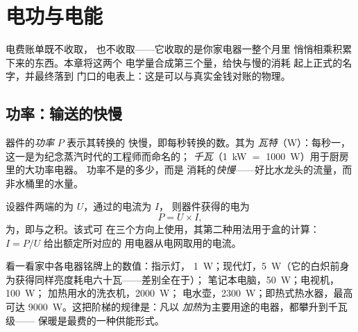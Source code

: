 \chapter{电功与电能}\label{ch:g9:electric-power-energy}

电费账单既不收取，
也不收取——它收取的是你家电器一整个月里
悄悄相乘积累下来的东西。本章将这两个
电学量合成第三个量，给快与慢的消耗
起上正式的名字，并最终落到
门口的电表上：这是可以与真实金钱对账的物理。

\section{功率：输送的快慢}

\begin{definition}[功率与瓦特]\label{def:g9:electric-power-energy:power}
器件的\emph{功率} $P$ 表示其转换的
快慢，即每秒转换的数。其为
\emph{瓦特}（\unit{W}）：每秒一，
这一是为纪念蒸汽时代的工程师而命名的；
\emph{千瓦}（\qty{1}{kW} $=$ \qty{1000}{W}）用于厨房里的大功率电器。
功率不是的多少，而是
消耗的\emph{快慢}——好比水龙头的流量，而非水桶里的水量。
%
\end{definition}

\begin{proposition}[电功率]\label{prop:g9:electric-power-energy:UI}
设器件两端的为 $U$，通过的电流为 $I$，
则器件获得的电为
\[
P = U \times I ,
\]
为，即与之积。该式可
在三个方向上使用，其第二种用法用于盒的计算：
$I = P/U$ 给出额定所对应的
用电器从电网取用的电流。
\end{proposition}

\begin{example}[家用电器的功率阶梯]\label{ex:g9:electric-power-energy:ladder}
看一看家中各电器铭牌上的数值：指示灯，
\qty{1}{W}；现代灯，\qty{5}{W}（它的白炽前身
为获得同样亮度耗电六十瓦——差别全在于）；
笔记本电脑，\qty{50}{W}；电视机，\qty{100}{W}；
加热用水的洗衣机，\qty{2000}{W}；
电水壶，\qty{2300}{W}；即热式热水器，最高可达
\qty{9000}{W}。这把阶梯的规律是：凡以
\emph{加热}为主要用途的电器，都攀升到千瓦级——
保暖是最费的一种供能形式。
\end{example}

